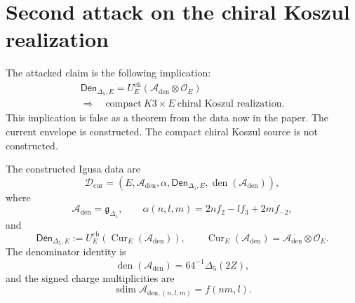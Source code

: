 \section{Second attack on the chiral Koszul realization}
\label{sec:chiral-koszul-second-attack}

\providecommand{\Z}{\mathbb Z}
\providecommand{\C}{\mathbb C}
\providecommand{\Ran}{\operatorname{Ran}}
\providecommand{\Cur}{\operatorname{Cur}}
\providecommand{\Prim}{\operatorname{Prim}}
\providecommand{\Obs}{\operatorname{Obs}}
\providecommand{\BKM}{\mathrm{BKM}}
\providecommand{\Hall}{\mathrm{Hall}}
\providecommand{\hCS}{\mathrm{hCS}}
\providecommand{\barB}{\bar B}
\providecommand{\Omegach}{\Omega^{\mathrm{ch}}}
\providecommand{\SCchtop}{\mathsf{SC}^{\mathrm{ch,top}}}
\providecommand{\Den}{\mathsf{Den}}
\providecommand{\smult}{\operatorname{smult}}
\providecommand{\sdim}{\operatorname{sdim}}

The attacked claim is the following implication:
$$
\begin{gathered}
\Den_{\Delta_5,E}
=U_E^{\mathrm{ch}}\!
\left(\mathcal A_{\mathrm{den}}\otimes\mathcal O_E\right)\\
\Longrightarrow\quad
\text{compact}\ K3\times E\ \text{chiral Koszul realization.}
\end{gathered}
$$
This implication is false as a theorem from the data now in the paper.
The current envelope is constructed.  The compact chiral Koszul source is
not constructed.

\begin{definition}
\label{def:second-attack-constructed-data}
The constructed Igusa data are
$$
\mathcal D_{\mathrm{cur}}=
\left(
E,\mathcal A_{\mathrm{den}},\alpha,
\Den_{\Delta_5,E},
\operatorname{den}(\mathcal A_{\mathrm{den}})
\right),
$$
where
$$
\mathcal A_{\mathrm{den}}=\mathfrak g_{\Delta_5},\qquad
\alpha(n,l,m)=2nf_2-lf_3+2mf_{-2},
$$
and
$$
\Den_{\Delta_5,E}
:=U_E^{\mathrm{ch}}\!
\left(\Cur_E(\mathcal A_{\mathrm{den}})\right),
\qquad
\Cur_E(\mathcal A_{\mathrm{den}})
=\mathcal A_{\mathrm{den}}\otimes\mathcal O_E.
$$
The denominator identity is
$$
\operatorname{den}(\mathcal A_{\mathrm{den}})
=64^{-1}\Delta_5(2Z),
$$
and the signed charge multiplicities are
$$
\sdim\mathcal A_{\mathrm{den},(n,l,m)}=f(nm,l).
$$
\end{definition}

